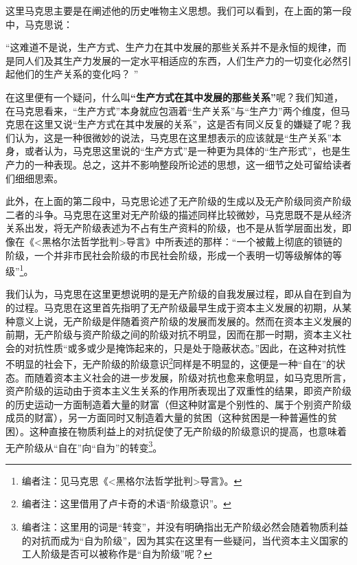 \documentclass[a4paper,twoside,12pt,AutoFakeBold]{ctexart}
\begin{document}
这里马克思主要是在阐述他的历史唯物主义思想。我们可以看到，在上面的第一段中，马克思说：
\begin{adjustwidth}{2em}{2em}
    \qquad\fangsong
    “这难道不是说，生产方式、生产力在其中发展的那些关系并不是永恒的规律，而是同人们及其生产力发展的一定水平相适应的东西，人们生产力的一切变化必然引起他们的生产关系的变化吗？ ”
\end{adjustwidth}

在这里便有一个疑问，什么叫\textbf{“生产方式在其中发展的那些关系”}呢？我们知道，在马克思看来，“生产方式”本身就应包涵着“生产关系”与“生产力”两个维度，但马克思在这里又说“生产方式在其中发展的关系”，这是否有同义反复的嫌疑了呢？我们认为，这是一种很微妙的说法，马克思在这里想表示的应该就是“生产关系”本身，或者认为，马克思这里说的“生产方式”是一种更为具体的“生产形式”，也是生产力的一种表现。总之，这并不影响整段所论述的思想，这一细节之处可留给读者们细细思索。

此外，在上面的第二段中，马克思论述了无产阶级的生成以及无产阶级同资产阶级二者的斗争。马克思在这里对无产阶级的描述同样比较微妙，马克思既不是从经济关系出发，将无产阶级表述为不占有生产资料的阶级，也不是从哲学层面出发，即像在《<黑格尔法哲学批判>导言》中所表述的那样：“一个被戴上彻底的锁链的阶级，一个并非市民社会阶级的市民社会阶级，形成一个表明一切等级解体的等级”\footnote{编者注：见马克思《<黑格尔法哲学批判>导言》。}。

我们认为，马克思在这里更想说明的是无产阶级的自我发展过程，即从自在到自为的过程。马克思在这里首先指明了无产阶级最早生成于资本主义发展的初期，从某种意义上说，无产阶级是伴随着资产阶级的发展而发展的。然而在资本主义发展的前期，无产阶级与资产阶级之间的阶级对抗不明显，因而在那一时期，资本主义社会的对抗性质“或多或少是掩饰起来的，只是处于隐蔽状态。”因此，在这种对抗性不明显的社会下，无产阶级的阶级意识\footnote{编者注：这里借用了卢卡奇的术语“阶级意识”。}同样是不明显的，这便是一种“自在”的状态。而随着资本主义社会的进一步发展，阶级对抗也愈来愈明显，如马克思所言，资产阶级的运动由于资本主义生关系的作用所表现出了双重性的结果，即资产阶级的历史运动一方面制造着大量的财富（但这种财富是个别性的、属于个别资产阶级成员的财富），另一方面同时又制造着大量的贫困（这种贫困是一种普遍性的贫困）。这种直接在物质利益上的对抗促使了无产阶级的阶级意识的提高，也意味着无产阶级从“自在”向“自为”的转变\footnote{编者注：这里用的词是“转变”，并没有明确指出无产阶级必然会随着物质利益的对抗而成为“自为阶级”，因为其实在这里有一些疑问，当代资本主义国家的工人阶级是否可以被称作是“自为阶级”呢？}。
\end{document}
